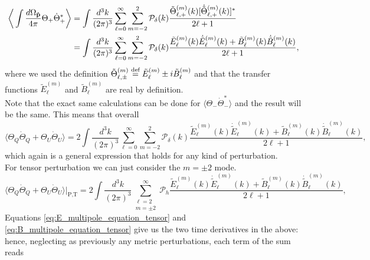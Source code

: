 \begin{align*}
    \bigg\langle\int\frac{d\Omega_{\mathbf{\hat{p}}}}{4\pi}\Theta_+\dot \Theta_+^*\bigg\rangle&=\int\frac{d^3k}{(2\pi)^3}\sum_{\ell=0}^{\infty}\sum_{m=-2}^{2}\mathcal{P}_\delta (k)\frac{\tilde\Theta_{\ell,+}^{(m)}(k)[\dot{\tilde\Theta}_{\ell,+}^{(m)}(k)]^*}{2\ell+1}\\&=\int\frac{d^3k}{(2\pi)^3}\sum_{\ell=0}^{\infty}\sum_{m=-2}^{2}\mathcal{P}_\delta (k)\frac{\tilde E_{\ell}^{(m)}(k)\dot{\tilde E}_{\ell}^{(m)}(k)+\tilde B_{\ell}^{(m)}(k)\dot{\tilde B}_{\ell}^{(m)}(k)}{2\ell+1},
\end{align*}
where we used the definition $\tilde \Theta_{\ell,\pm}^{(m)}\stackrel{\text{def}}{=}\tilde E_{\ell}^{(m)}\pm i\tilde B_\ell^{(m)}$ and that the transfer functions $\tilde E_\ell^{(m)}$ and $\tilde B_\ell^{(m)}$ are real by definition. \\
Note that the exact same calculations can be done for $\langle\Theta_-\dot \Theta_-^*\rangle$ and the result will be the same. This means that overall
\begin{equation}
    \langle\Theta_Q\dot\Theta_Q+\Theta_U\dot\Theta_U\rangle=2\int\frac{d^3k}{(2\pi)^3}\sum_{\ell=0}^{\infty}\sum_{m=-2}^{2}\mathcal{P}_\delta (k)\frac{\tilde E_{\ell}^{(m)}(k)\dot{\tilde E}_{\ell}^{(m)}(k)+\tilde B_{\ell}^{(m)}(k)\dot{\tilde B}_{\ell}^{(m)}(k)}{2\ell+1},
\end{equation}
which again is a general expression that holds for any kind of perturbation.\\
For tensor perturbation we can just consider the $m=\pm2$ mode.
\begin{equation*}
    \langle\Theta_Q\dot\Theta_Q+\Theta_U\dot\Theta_U\rangle\bigg|_\text{P,T}=2\int\frac{d^3k}{(2\pi)^3}\sum_{\substack{\ell=2\\m=\pm2}}^{\infty}\mathcal{P}_h\frac{\tilde E_{\ell}^{(m)}(k)\dot{\tilde E}_{\ell}^{(m)}(k)+\tilde B_{\ell}^{(m)}(k)\dot{\tilde B}_{\ell}^{(m)}(k)}{2\ell+1},
\end{equation*}
Equations \eqref{eq:E_multipole_equation_tensor} and \eqref{eq:B_multipole_equation_tensor} give us the two time derivatives in the above: hence, neglecting as previously any metric perturbations, each term of the sum reads
